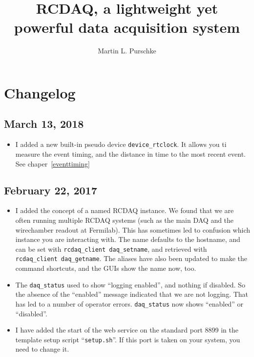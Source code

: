 \documentclass{article}[11pt]
\begin{document}
\title{RCDAQ, a lightweight yet powerful data acquisition system}
\author{Martin L. Purschke}
\maketitle

\tableofcontents

\newpage

\section{Changelog}

\subsection{March 13, 2018}
\begin{itemize}
\item I added a new built-in pseudo device \verb|device_rtclock|.  It
  allows you ti measure the event timing, and the distance in time to
  the most recent event. See chaper~\ref{eventtiming}
\end{itemize}

\subsection{February 22, 2017}
\begin{itemize}
\item I added the concept of a named RCDAQ instance. We found that we
  are often running multiple RCDAQ systems (such as the main DAQ and
  the wirechamber readout at Fermilab). This has sometimes led to
  confusion which instance you are interacting with. The name
  defaults to the hostname, and can be set with
  \verb|rcdaq_client daq_setname|, and retrieved with
  \verb|rcdaq_client daq_getname|.  The aliases have also been
  updated to make the command shortcuts, and the GUIs show the name
  now, too. 
\item The \verb|daq_status| used to show ``logging enabled'', and nothing if
  disabled. So the absence of the ``enabled'' message indicated
  that we are not logging. That has led to a number of operator
  errors. \verb|daq_status| now shows ``enabled'' or ``disabled''. 
\item I have added the start of the web service on the standard port
  8899 in the template setup script ``\verb|setup.sh|''. If this port
  is taken on your system, you need to change it. 

\end{itemize}
\end{document}

